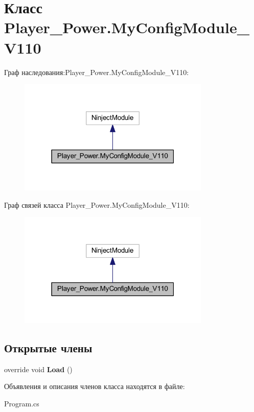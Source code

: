 \section{Класс Player\-\_\-\-Power.\-My\-Config\-Module\-\_\-\-V110}
\label{class_player___power_1_1_my_config_module___v110}


Граф наследования\-:Player\-\_\-\-Power.\-My\-Config\-Module\-\_\-\-V110\-:
\nopagebreak
\begin{figure}[H]
\begin{center}
\leavevmode
\includegraphics[width=259pt]{class_player___power_1_1_my_config_module___v110__inherit__graph}
\end{center}
\end{figure}


Граф связей класса Player\-\_\-\-Power.\-My\-Config\-Module\-\_\-\-V110\-:
\nopagebreak
\begin{figure}[H]
\begin{center}
\leavevmode
\includegraphics[width=259pt]{class_player___power_1_1_my_config_module___v110__coll__graph}
\end{center}
\end{figure}
\subsection*{Открытые члены}
\begin{DoxyCompactItemize}
\item 
override void {\bfseries Load} ()\label{class_player___power_1_1_my_config_module___v110_a9fb768c54955b78c1bdeb8d4d79b071a}

\end{DoxyCompactItemize}


Объявления и описания членов класса находятся в файле\-:\begin{DoxyCompactItemize}
\item 
Program.\-cs\end{DoxyCompactItemize}
